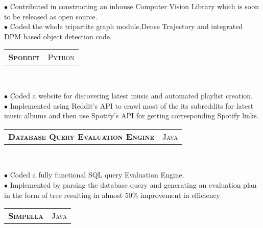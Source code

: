 \documentclass[10pt,a4paper,oneside]{article}
\begin{document}
\begin{minipage}[t]{0.63\textwidth}
\begin{adjustwidth}{7pt}{0pt}
            {\footnotesize $\bullet$ Contributed in constructing an inhouse Computer Vision Library which is soon to be released as open
                source.\\
            $\bullet$ Coded the whole tripartite graph module,Dense Trajectory and integrated DPM based object detection code.}\\
        \end{adjustwidth}
        \begin{tabular}{c|c}
            \textbf{\normalsize S\textsc{poddit}}
            &\textmd{\normalsize P\textsc{ython}}
        \end{tabular}\\
         \vspace{-4mm}
        \begin{adjustwidth}{7pt}{0pt}
            {\footnotesize $\bullet$ Coded a website for discovering latest music and automated playlist creation.\\ 
            $\bullet$ Implemented using Reddit's API to crawl most of the its subreddits for latest music albums and then use Spotify's API for
            getting corresponding Spotify links.}\\
        \end{adjustwidth}
        \begin{tabular}{c|c}
            \textbf{\normalsize D\textsc{atabase} Q\textsc{uery}
            E\textsc{valuation} E\textsc{ngine}}
            &\textmd{\normalsize J\textsc{ava}}
        \end{tabular}\\
         \vspace{-4mm}
        \begin{adjustwidth}{7pt}{0pt}
            {\footnotesize $\bullet$ Coded a fully functional SQL query Evaluation Engine.\\
            $\bullet$ Implemented by parsing the database query and generating an evaluation plan in the form of tree resulting in almost
            50\% improvement in efficiency}\\
        \end{adjustwidth}
        \begin{tabular}{c|c}
            \textbf{\normalsize S\textsc{impella}}
            &\textmd{\normalsize J\textsc{ava}}
        \end{tabular}\\
         \vspace{-4mm}
        \begin{adjustwidth}{7pt}{0pt}

\end{adjustwidth}
\end{minipage}
\end{document}
